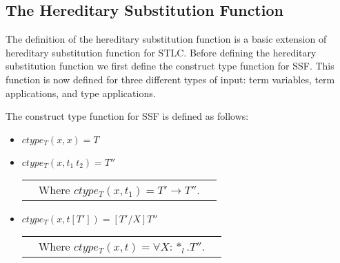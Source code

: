 \subsection{The Hereditary Substitution Function}
\label{subsec:the_hereditary_substitution_function}
The definition of the hereditary substitution function is a basic
extension of hereditary substitution function for STLC.  Before
defining the hereditary substitution function we first define the
construct type function for SSF.  This function is now defined for
three different types of input: term variables, term applications, and
type applications.
\begin{definition}
  \label{def:ctype_function_ssf}
  The construct type function for SSF is defined as follows:
  \begin{itemize}
  \item[] $ctype_T(x,x) = T$
  \item[] $ctype_T(x,t_1\ t_2) = T''$\\
    \begin{tabular}{lll}
      & Where $ctype_T(x,t_1) = T' \to T''$.
    \end{tabular}    
  \item[] $ctype_T(x,t[T']) = [T'/X]T''$\\
    \begin{tabular}{lll}
      & Where $ctype_T(x,t) = \forall X:*_l.T''$.
    \end{tabular}    
  \end{itemize}
\end{definition}

